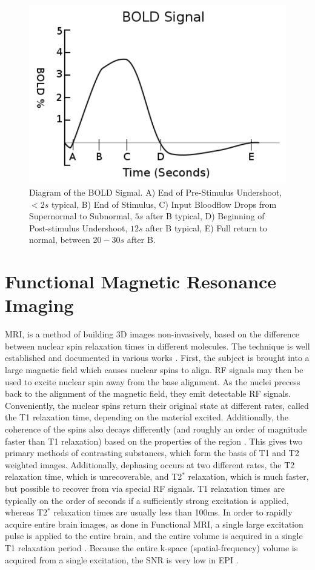 \begin{figure}
\centering
\includegraphics[width=.5\textwidth]{images/bold2}
\caption[Diagram of \ac{BOLD} Signal]{Diagram of the \ac{BOLD} Sigmal.
A) End of Pre-Stimulus Undershoot, $< 2s$ typical,
B) End of Stimulus, C) Input Bloodflow Drops from Supernormal to Subnormal,
$5 s$ after B typical, D) Beginning of Post-stimulus Undershoot, $12 s$ after B
typical, E) Full return to normal, between $20-30s$ after B.}
\end{figure}

\section{Functional Magnetic Resonance Imaging}
\ac{MRI}, is a method of building 3D images
non-invasively, based on the difference between nuclear spin
relaxation times in different molecules. The technique is
well established and documented in various works \cite{Bushberg2002}. 
First, the subject 
is brought into a large magnetic field which causes nuclear spins
to align. \ac{RF} signals may
then be used to excite nuclear spin away from the base alignment. 
As the nuclei precess back to the alignment of the magnetic
field, they emit detectable \ac{RF} signals. Conveniently, the
nuclear spins return their original state at different
rates, called the \ac{T1} relaxation time, depending on the material excited.
Additionally, the
coherence of the spins also decays differently (and roughly an order of 
magnitude faster
than \ac{T1} relaxation) based on the properties of the region 
\cite{Bushberg2002}.
This gives two primary methods of contrasting substances,
which form the basis of \ac{T1} and \ac{T2} weighted images. Additionally, 
dephasing occurs at two different rates, the \ac{T2} relaxation time,
which is unrecoverable, and \ac{T2}$^*$ relaxation, which is
much faster, but possible to recover from via special \ac{RF} signals.
\ac{T1} relaxation times are typically on the order of seconds if 
a sufficiently strong excitation is applied, whereas \ac{T2}$^*$ relaxation
times are usually less than 100ms. 
In order to rapidly acquire entire brain images, as done in Functional 
\ac{MRI}, a single large excitation pulse is applied to the entire brain,
and the entire volume is acquired in a single \ac{T1} relaxation period
\cite{Obata2004}. 
Because the entire k-space (spatial-frequency) volume is acquired 
from a single excitation, the \ac{SNR} is very low
in \ac{EPI} \cite{Smith2007}. 

